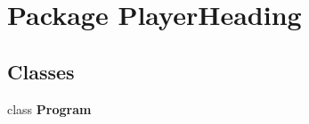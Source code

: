 \hypertarget{namespace_player_heading}{\section{Package Player\-Heading}
\label{namespace_player_heading}
}
\subsection*{Classes}
\begin{DoxyCompactItemize}
\item 
class {\bfseries Program}
\end{DoxyCompactItemize}
